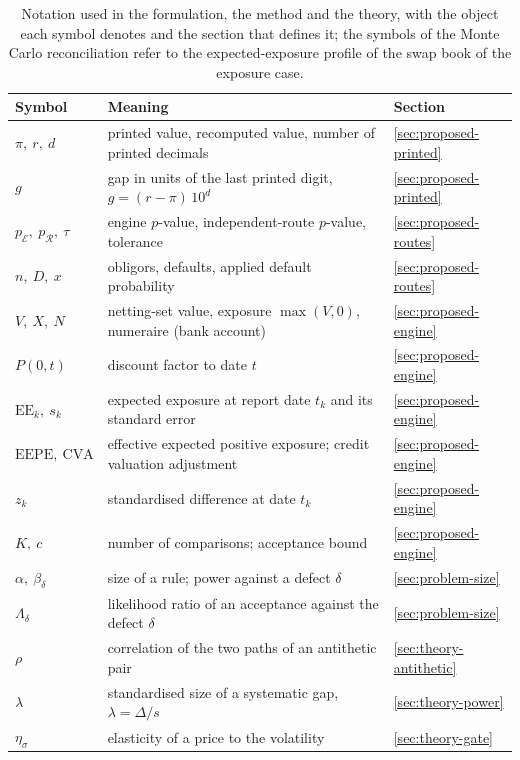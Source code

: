 \begin{table}[htbp]
\centering
\small
\caption{Notation used in the formulation, the method and the theory, with the object each symbol denotes and the section that defines it; the symbols of the Monte Carlo reconciliation refer to the expected-exposure profile of the swap book of the exposure case.}
\label{tab:notation}
\begin{tabularx}{\textwidth}{@{}l>{\raggedright\arraybackslash}X l@{}}
\toprule
Symbol & Meaning & Section \\
\midrule
$\pi,\ r,\ d$ & printed value, recomputed value, number of printed decimals & \ref{sec:proposed-printed} \\
$g$ & gap in units of the last printed digit, $g=(r-\pi)\,10^{d}$ & \ref{sec:proposed-printed} \\
$p_{\mathcal{E}},\ p_{\mathcal{R}},\ \tau$ & engine $p$-value, independent-route $p$-value, tolerance & \ref{sec:proposed-routes} \\
$n,\ D,\ x$ & obligors, defaults, applied default probability & \ref{sec:proposed-routes} \\
$V,\ X,\ N$ & netting-set value, exposure $\max(V,0)$, numeraire (bank account) & \ref{sec:proposed-engine} \\
$P(0,t)$ & discount factor to date $t$ & \ref{sec:proposed-engine} \\
$\mathrm{EE}_k,\ s_k$ & expected exposure at report date $t_k$ and its standard error & \ref{sec:proposed-engine} \\
$\mathrm{EEPE},\ \mathrm{CVA}$ & effective expected positive exposure; credit valuation adjustment & \ref{sec:proposed-engine} \\
$z_k$ & standardised difference at date $t_k$ & \ref{sec:proposed-engine} \\
$K,\ c$ & number of comparisons; acceptance bound & \ref{sec:proposed-engine} \\
$\alpha,\ \beta_\delta$ & size of a rule; power against a defect $\delta$ & \ref{sec:problem-size} \\
$\Lambda_\delta$ & likelihood ratio of an acceptance against the defect $\delta$ & \ref{sec:problem-size} \\
$\rho$ & correlation of the two paths of an antithetic pair & \ref{sec:theory-antithetic} \\
$\lambda$ & standardised size of a systematic gap, $\lambda=\Delta/s$ & \ref{sec:theory-power} \\
$\eta_\sigma$ & elasticity of a price to the volatility & \ref{sec:theory-gate} \\
\bottomrule
\end{tabularx}
\end{table}
